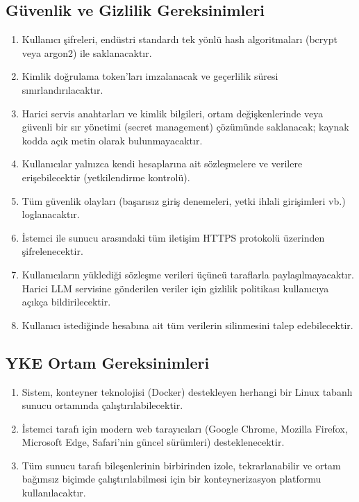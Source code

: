 \documentclass[12pt, a4paper]{article}
\begin{document}
\subsection{Güvenlik ve Gizlilik Gereksinimleri}

\begin{enumerate}[leftmargin=2cm]
    \item Kullanıcı şifreleri, endüstri standardı tek yönlü hash algoritmaları (bcrypt veya argon2) ile saklanacaktır.
    \item Kimlik doğrulama token'ları imzalanacak ve geçerlilik süresi sınırlandırılacaktır.
    \item Harici servis anahtarları ve kimlik bilgileri, ortam değişkenlerinde veya güvenli bir sır yönetimi (secret management) çözümünde saklanacak; kaynak kodda açık metin olarak bulunmayacaktır.
    \item Kullanıcılar yalnızca kendi hesaplarına ait sözleşmelere ve verilere erişebilecektir (yetkilendirme kontrolü).
    \item Tüm güvenlik olayları (başarısız giriş denemeleri, yetki ihlali girişimleri vb.) loglanacaktır.
    \item İstemci ile sunucu arasındaki tüm iletişim HTTPS protokolü üzerinden şifrelenecektir.
    \item Kullanıcıların yüklediği sözleşme verileri üçüncü taraflarla paylaşılmayacaktır. Harici LLM servisine gönderilen veriler için gizlilik politikası kullanıcıya açıkça bildirilecektir.
    \item Kullanıcı istediğinde hesabına ait tüm verilerin silinmesini talep edebilecektir.
\end{enumerate}

\subsection{YKE Ortam Gereksinimleri}

\begin{enumerate}[leftmargin=2cm]
    \item Sistem, konteyner teknolojisi (Docker) destekleyen herhangi bir Linux tabanlı sunucu ortamında çalıştırılabilecektir.
    \item İstemci tarafı için modern web tarayıcıları (Google Chrome, Mozilla Firefox, Microsoft Edge, Safari'nin güncel sürümleri) desteklenecektir.
    \item Tüm sunucu tarafı bileşenlerinin birbirinden izole, tekrarlanabilir ve ortam bağımsız biçimde çalıştırılabilmesi için bir konteynerizasyon platformu kullanılacaktır.
\end{enumerate}
\end{document}
